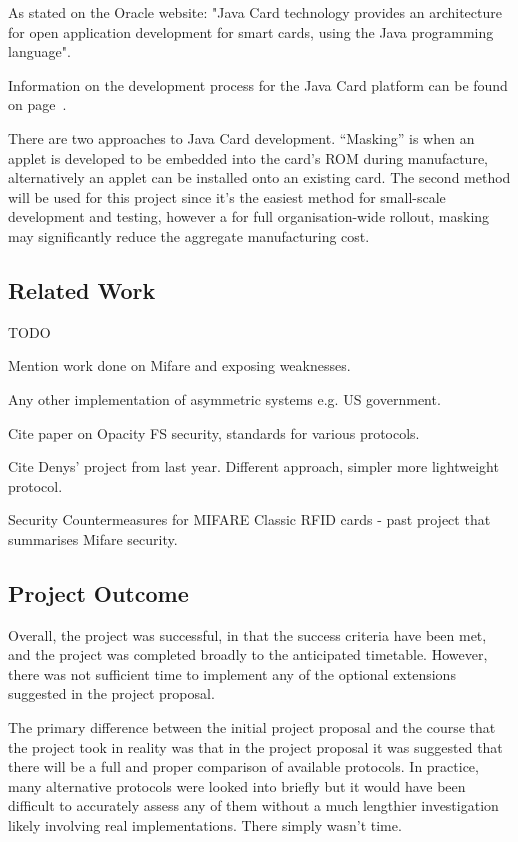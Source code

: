 \documentclass[12pt]{article}
\begin{document}
As stated on the Oracle website: "Java Card technology provides an architecture for open application development for smart cards, using the Java programming language".

Information on the development process for the Java Card platform can be found on page~\pageref{build_process}.

There are two approaches to Java Card development. “Masking” is when an applet is developed to be embedded into the card’s ROM during manufacture, alternatively an applet can be installed onto an existing card. The second method will be used for this project since it’s the easiest method for small-scale development and testing, however a for full organisation-wide rollout, masking may significantly reduce the aggregate manufacturing cost.



\subsection{Related Work}
TODO

Mention work done on Mifare and exposing weaknesses.

Any other implementation of asymmetric systems e.g. US government.



Cite paper on Opacity FS security, standards for various protocols.

Cite Denys' project from last year. Different approach, simpler more lightweight protocol.

Security Countermeasures for MIFARE Classic RFID cards - past project that summarises Mifare security.


\subsection{Project Outcome}
Overall, the project was successful, in that the success criteria have been met, and the project was completed broadly to the anticipated timetable. However, there was not sufficient time to implement any of the optional extensions suggested in the project proposal.

The primary difference between the initial project proposal and the course that the project took in reality was that in the project proposal it was suggested that there will be a full and proper comparison of available protocols. In practice, many alternative protocols were looked into briefly but it would have been difficult to  accurately assess any of them without a much lengthier investigation likely involving real implementations. There simply wasn't time.
\end{document}
